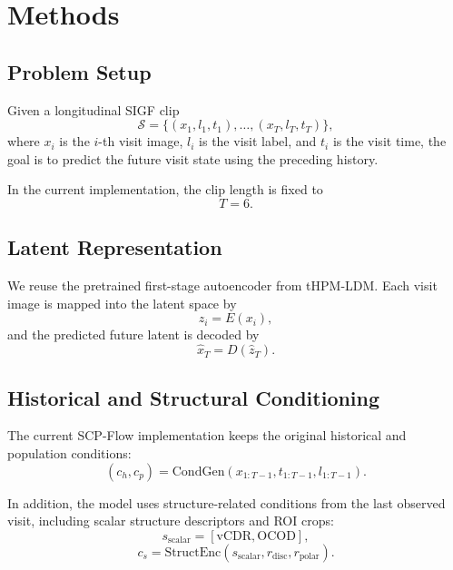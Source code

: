 \section{Methods}

\subsection{Problem Setup}

Given a longitudinal SIGF clip
\begin{equation}
\mathcal{S}=\{(x_1,l_1,t_1),\dots,(x_T,l_T,t_T)\},
\end{equation}
where $x_i$ is the $i$-th visit image, $l_i$ is the visit label, and $t_i$ is the visit time, the goal is to predict the future visit state using the preceding history.

In the current implementation, the clip length is fixed to
\begin{equation}
T=6.
\end{equation}

\subsection{Latent Representation}

We reuse the pretrained first-stage autoencoder from tHPM-LDM. Each visit image is mapped into the latent space by
\begin{equation}
z_i = E(x_i),
\end{equation}
and the predicted future latent is decoded by
\begin{equation}
\hat{x}_T = D(\hat{z}_T).
\end{equation}

\subsection{Historical and Structural Conditioning}

The current SCP-Flow implementation keeps the original historical and population conditions:
\begin{equation}
(c_h, c_p) = \mathrm{CondGen}(x_{1:T-1}, t_{1:T-1}, l_{1:T-1}).
\end{equation}

In addition, the model uses structure-related conditions from the last observed visit, including scalar structure descriptors and ROI crops:
\begin{equation}
s_{\mathrm{scalar}} = [\mathrm{vCDR}, \mathrm{OCOD}],
\end{equation}
\begin{equation}
c_s = \mathrm{StructEnc}(s_{\mathrm{scalar}}, r_{\mathrm{disc}}, r_{\mathrm{polar}}).
\end{equation}

